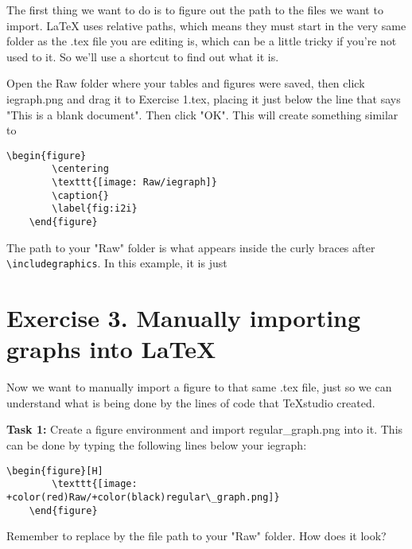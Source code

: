 \documentclass[12pts]{report}
\begin{document}
The first thing we want to do is to figure out the path to the files we want to import. {\LaTeX} uses relative paths, which means they must start in the very same folder as the .tex file you are editing is, which can be a little tricky if you're not used to it. So we'll use a shortcut to find out what it is.

Open the Raw folder where your tables and figures were saved, then click iegraph.png and drag it to Exercise 1.tex, placing it just below the line that says "This is a blank document". Then click "OK". This will create something similar to

\begin{center}
\begin{Verbatim}[commandchars=+\(\)]
	\begin{figure}
		\centering
		\texttt{[image: Raw/iegraph]}
		\caption{}
		\label{fig:i2i}
	\end{figure}
\end{Verbatim}
\end{center}

The path to your "Raw" folder is what appears inside the curly braces after \verb|\includegraphics|. In this example, it is just \color{red}{\verb|Raw/|}\color{black}{.}

\section*{Exercise 3. Manually importing graphs into \LaTeX}

Now we want to manually import a figure to that same .tex file, just so we can understand what is being done by the lines of code that TeXstudio created.

\textbf{Task 1:} Create a figure environment and import regular\_graph.png into it. This can be done by typing the following lines below your iegraph:

\begin{center}
	\begin{Verbatim}[commandchars=+\(\)]
	\begin{figure}[H]
		\texttt{[image: +color(red)Raw/+color(black)regular\_graph.png]}
	\end{figure}
	\end{Verbatim}
\end{center}

Remember to replace \color{red}{\verb|Raw/|}\color{black}{} by the file path to your "Raw" folder. How does it look? 
\end{document}
